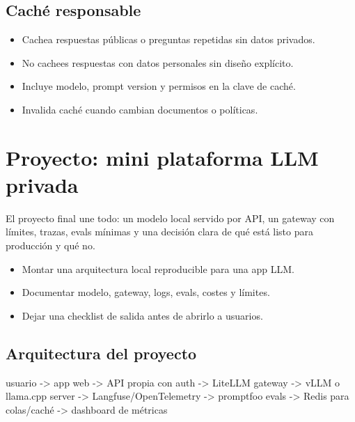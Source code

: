 \documentclass[11pt,a4paper]{book}
\begin{document}
\section{Caché responsable}
\begin{itemize}\item Cachea respuestas públicas o preguntas repetidas sin datos privados.\end{itemize}
\begin{itemize}\item No cachees respuestas con datos personales sin diseño explícito.\end{itemize}
\begin{itemize}\item Incluye modelo, prompt version y permisos en la clave de caché.\end{itemize}
\begin{itemize}\item Invalida caché cuando cambian documentos o políticas.\end{itemize}
\chapter{Proyecto: mini plataforma LLM privada}
El proyecto final une todo: un modelo local servido por API, un gateway con límites, trazas, evals mínimas y una decisión clara de qué está listo para producción y qué no.

\begin{itemize}\item Montar una arquitectura local reproducible para una app LLM.\end{itemize}
\begin{itemize}\item Documentar modelo, gateway, logs, evals, costes y límites.\end{itemize}
\begin{itemize}\item Dejar una checklist de salida antes de abrirlo a usuarios.\end{itemize}
\section{Arquitectura del proyecto}
\begin{codebox}
usuario
  -> app web
  -> API propia con auth
  -> LiteLLM gateway
  -> vLLM o llama.cpp server
  -> Langfuse/OpenTelemetry
  -> promptfoo evals
  -> Redis para colas/caché
  -> dashboard de métricas
\end{codebox}
\end{document}
